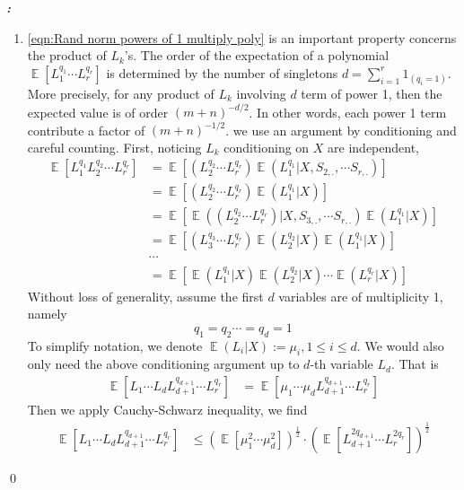 \documentclass[12pt]{extarticle}
\renewenvironment{proof}[1][\proofname]{ { \it\bfseries #1: }}{\qed}
\newcommand{\1}{\field{1}}
\DeclareMathOperator{\E}{\mathbb{E}}
\numberwithin{equation}{section}
\begin{document}
\begin{proof}
\begin{enumerate}[label={(\arabic*)}]
\item \cref{eqn:Rand norm powers of 1 multiply poly} is an important property concerns the product of $L_k$'s. 
The order of the expectation of a polynomial $\E[L_1^{q_1}\cdots L_r^{q_r} ]$ is determined by the number of singletons $d = \sum_{i=1}^r 1_{(q_i=1)}$. 
More precisely, for any product of $L_k$ involving $d$ term of power 1, then the expected value is of order $(m+n)^{-d/2}$. In other words, each power 1 term contribute a factor of $(m+n)^{-1/2}$. we use an argument by conditioning  and careful counting. First, noticing $L_k$ conditioning on $X$ are independent,
\begin{align*}
    \E [L_1^{q_1} L_2^{q_2}\cdots L_r^{q_r} ]
    & = \E \left[(L_2^{q_2}\cdots L_r^{q_r})\E(L_1^{q_1}| X, S_{2,.},\cdots S_{r,.} ) \right] \\
    & = \E \left[(L_2^{q_2}\cdots L_r^{q_r})\E(L_1^{q_1}| X ) \right] \\
    & = \E \left[ \E \left((L_2^{q_2}\cdots L_r^{q_r})|X, S_{3,.},\cdots S_{r,.} \right) \E(L_1^{q_1}| X )  \right] \\
    & = \E \left[ (L_3^{q_3}\cdots L_r^{q_r})\E \left(L_2^{q_2}| X \right) \E(L_1^{q_1}| X )  \right] \\
    & \cdots \\
    & = \E \left[  \E(L_1^{q_1}| X ) \E \left(L_2^{q_2}| X \right) \cdots \E \left(L_r^{q_r}| X \right) \right] 
\end{align*}
Without loss of generality, assume the first $d$ variables are of multiplicity 1, namely 
\[
q_1 = q_2 \cdots = q_d =1
\]
To simplify notation, we denote  $\E (L_i | X) :=\mu_i, 1\le i\le d$. We would also only need the above conditioning argument up to $d$-th variable $L_d$. That is 
\begin{align*}
    \E [L_1\cdots L_d L_{d+1}^{q_{d+1}}\cdots L_r^{q_r} ]
    & = \E [\mu_1 \cdots \mu_d L_{d+1}^{q_{d+1}}\cdots L_r^{q_r} ]
\end{align*}
Then we apply Cauchy-Schwarz inequality, we find
\begin{align}
    \E [L_1\cdots L_d L_{d+1}^{q_{d+1}}\cdots L_r^{q_r} ]
    & \le \left( \E [\mu_1^2 \cdots \mu_d^2] \right)^{\frac{1}{2}}  \cdot \left( \E [L_{d+1}^{2q_{d+1}}\cdots L_r^{2q_r} ] \right)^{\frac{1}{2}} 
    \label{eqn:Rand norm powers of 1 Cauchy-Schwarz}
\end{align}


\end{enumerate}
\end{proof}
\end{document}
